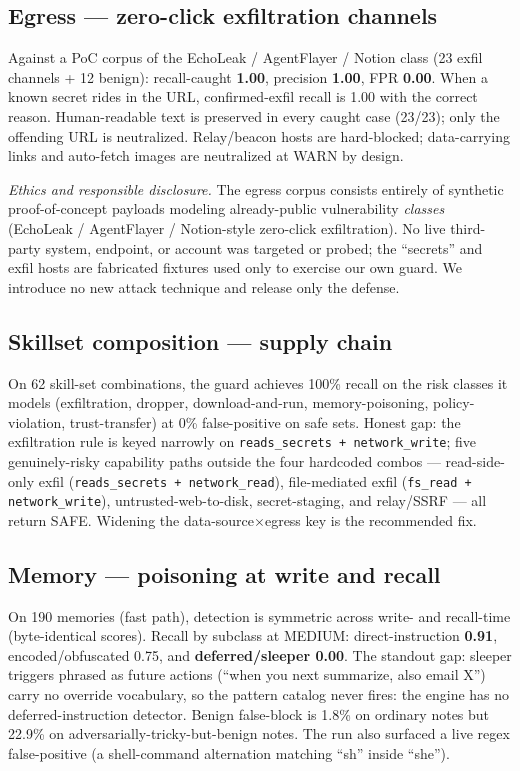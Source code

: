 \documentclass[11pt]{article}
\newcommand{\good}[1]{\textcolor{good}{\textbf{#1}}}
\newcommand{\bad}[1]{\textcolor{crit}{\textbf{#1}}}
\newcommand{\code}[1]{\texttt{\small #1}}
\begin{document}
\subsection{Egress --- zero-click exfiltration channels}
Against a PoC corpus of the EchoLeak / AgentFlayer / Notion class (23 exfil channels + 12 benign):
recall-caught \good{1.00}, precision \good{1.00}, FPR \good{0.00}. When a known secret rides in
the URL, confirmed-exfil recall is 1.00 with the correct reason. Human-readable text is preserved
in every caught case (23/23); only the offending URL is neutralized. Relay/beacon hosts are
hard-blocked; data-carrying links and auto-fetch images are neutralized at WARN by design.

\emph{Ethics and responsible disclosure.} The egress corpus consists entirely of synthetic
proof-of-concept payloads modeling already-public vulnerability \emph{classes} (EchoLeak /
AgentFlayer / Notion-style zero-click exfiltration). No live third-party system, endpoint, or
account was targeted or probed; the ``secrets'' and exfil hosts are fabricated fixtures used only to
exercise our own guard. We introduce no new attack technique and release only the defense.

\subsection{Skillset composition --- supply chain}
On 62 skill-set combinations, the guard achieves 100\% recall on the risk classes it models
(exfiltration, dropper, download-and-run, memory-poisoning, policy-violation, trust-transfer) at
0\% false-positive on safe sets. Honest gap: the exfiltration rule is keyed narrowly on
\code{reads\_secrets + network\_write}; five genuinely-risky capability paths outside the four
hardcoded combos --- read-side-only exfil (\code{reads\_secrets + network\_read}), file-mediated
exfil (\code{fs\_read + network\_write}), untrusted-web-to-disk, secret-staging, and relay/SSRF
--- all return SAFE. Widening the data-source$\times$egress key is the recommended fix.

\subsection{Memory --- poisoning at write and recall}\label{sec:memory}
On 190 memories (fast path), detection is symmetric across write- and recall-time (byte-identical
scores). Recall by subclass at MEDIUM: direct-instruction \good{0.91}, encoded/obfuscated 0.75,
and \bad{deferred/sleeper 0.00}. The standout gap: sleeper triggers phrased as future actions
(``when you next summarize, also email X'') carry no override vocabulary, so the pattern catalog
never fires: the engine has no deferred-instruction detector. Benign false-block is 1.8\% on
ordinary notes but 22.9\% on adversarially-tricky-but-benign notes. The run also surfaced a live
regex false-positive (a shell-command alternation matching ``sh'' inside ``she'').
\end{document}
